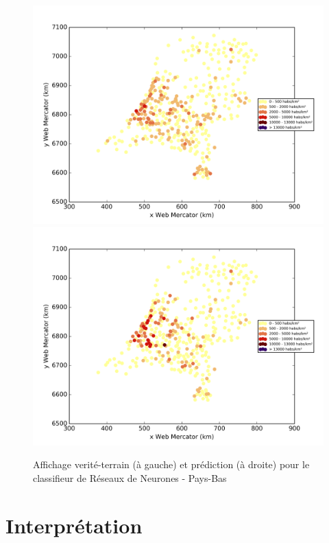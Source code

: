 \documentclass{book}
\begin{document}
\begin{figure}[H]
\centerline{
\includegraphics[scale=0.5]{../../data/Pays-Bas/test/Neural_Network_Classification-oversampling/Neural_Network_Classification-oversampling/density_ground_truth.png}
\includegraphics[scale=0.5]{../../data/Pays-Bas/test/Neural_Network_Classification-oversampling/Neural_Network_Classification-oversampling/density_classification.png}
}
\caption{Affichage verité-terrain (à gauche) et prédiction (à droite) pour le classifieur de Réseaux de Neurones - Pays-Bas}
\label{nn_carte_pays-bas}
\end{figure}

\section{Interprétation}
\end{document}
